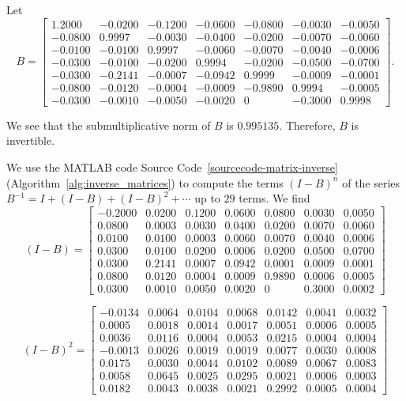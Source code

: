 \begin{example}
\label{inverse}
Let
\[
B = 
\begin{bmatrix}
    1.2000 & -0.0200 & -0.1200 & -0.0600 & -0.0800 & -0.0030 & -0.0050 \\
   -0.0800 & 0.9997 & -0.0030 & -0.0400 & -0.0200 & -0.0070 & -0.0060 \\
   -0.0100 & -0.0100 & 0.9997 & -0.0060 & -0.0070 & -0.0040 & -0.0006 \\
   -0.0300 & -0.0100 & -0.0200 & 0.9994 & -0.0200 & -0.0500 & -0.0700 \\
   -0.0300 & -0.2141 & -0.0007 & -0.0942 & 0.9999 & -0.0009 & -0.0001 \\
   -0.0800 & -0.0120 & -0.0004 & -0.0009 & -0.9890 & 0.9994 & -0.0005 \\
   -0.0300 & -0.0010 & -0.0050 & -0.0020 & 0 & -0.3000 & 0.9998
\end{bmatrix}.
\]

We see that the submultiplicative norm of $B$ is $0.995135$. Therefore, $B$ is invertible. 

We use the MATLAB code Source Code~\ref{sourcecode-matrix-inverse} (Algorithm~\ref{alg:inverse_matrices}) to compute the terms $(I-B)^{n}$ of the series $B^{-1} = I + (I -B ) + (I - B)^2 + \cdots$ up to $29$ terms. We find
\[
(I-B) = \begin{bmatrix}
   -0.2000 & 0.0200 & 0.1200 & 0.0600 & 0.0800 & 0.0030 & 0.0050 \\
    0.0800 & 0.0003 & 0.0030 & 0.0400 & 0.0200 & 0.0070 & 0.0060 \\
    0.0100 & 0.0100 & 0.0003 & 0.0060 & 0.0070 & 0.0040 & 0.0006 \\
    0.0300 & 0.0100 & 0.0200 & 0.0006 & 0.0200 & 0.0500 & 0.0700 \\
    0.0300 & 0.2141 & 0.0007 & 0.0942 & 0.0001 & 0.0009 & 0.0001 \\
    0.0800 & 0.0120 & 0.0004 & 0.0009 & 0.9890 & 0.0006 & 0.0005 \\
    0.0300 & 0.0010 & 0.0050 & 0.0020 & 0 & 0.3000 & 0.0002
\end{bmatrix}
\]

\[
(I-B)^2 = \begin{bmatrix}
   -0.0134 & 0.0064 & 0.0104 & 0.0068 & 0.0142 & 0.0041 & 0.0032 \\
    0.0005 & 0.0018 & 0.0014 & 0.0017 & 0.0051 & 0.0006 & 0.0005 \\
    0.0036 & 0.0116 & 0.0004 & 0.0053 & 0.0215 & 0.0004 & 0.0004 \\
   -0.0013 & 0.0026 & 0.0019 & 0.0019 & 0.0077 & 0.0030 & 0.0008 \\
    0.0175 & 0.0030 & 0.0044 & 0.0102 & 0.0089 & 0.0067 & 0.0083 \\
    0.0058 & 0.0645 & 0.0025 & 0.0295 & 0.0021 & 0.0006 & 0.0003 \\
    0.0182 & 0.0043 & 0.0038 & 0.0021 & 0.2992 & 0.0005 & 0.0004
\end{bmatrix}
\]


\end{example}
